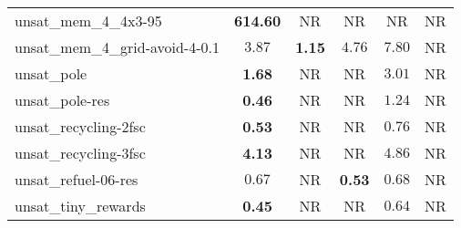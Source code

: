 \begin{tabular}{lccccc}
unsat\_mem\_4\_4x3-95 & \textbf{614.60} & NR & NR & NR & NR \\
unsat\_mem\_4\_grid-avoid-4-0.1 & $3.87$ & \textbf{1.15} & $4.76$ & $7.80$ & NR \\
unsat\_pole & \textbf{1.68} & NR & NR & $3.01$ & NR \\
unsat\_pole-res & \textbf{0.46} & NR & NR & $1.24$ & NR \\
unsat\_recycling-2fsc & \textbf{0.53} & NR & NR & $0.76$ & NR \\
unsat\_recycling-3fsc & \textbf{4.13} & NR & NR & $4.86$ & NR \\
unsat\_refuel-06-res & $0.67$ & NR & \textbf{0.53} & $0.68$ & NR \\
unsat\_tiny\_rewards & \textbf{0.45} & NR & NR & $0.64$ & NR \\
\bottomrule
\end{tabular}
